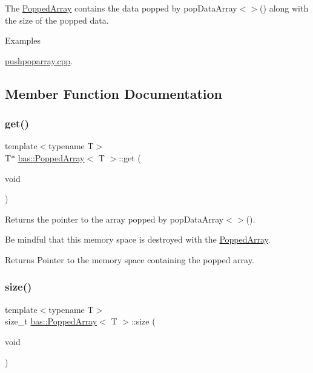 The \mbox{\hyperlink{classbas_1_1PoppedArray}{Popped\+Array}} contains the data popped by pop\+Data\+Array$<$$>$() along with the size of the popped data. \begin{Desc}
\item[Examples]\par
\mbox{\hyperlink{pushpoparray_8cpp-example}{pushpoparray.\+cpp}}.\end{Desc}


\subsection{Member Function Documentation}
\mbox{\label{classbas_1_1PoppedArray_a964ac49c32df363e64c4720479685036}} 
\subsubsection{\texorpdfstring{get()}{get()}}
{\footnotesize\ttfamily template$<$typename T$>$ \\
T$\ast$ \mbox{\hyperlink{classbas_1_1PoppedArray}{bas\+::\+Popped\+Array}}$<$ T $>$\+::get (\begin{DoxyParamCaption}\item[{void}]{ }\end{DoxyParamCaption})\hspace{0.3cm}{\ttfamily [inline]}}



Returns the pointer to the array popped by pop\+Data\+Array$<$$>$(). 

Be mindful that this memory space is destroyed with the \mbox{\hyperlink{classbas_1_1PoppedArray}{Popped\+Array}}.

\begin{DoxyReturn}{Returns}
Pointer to the memory space containing the popped array. 
\end{DoxyReturn}
\mbox{\label{classbas_1_1PoppedArray_aeaaba8025e58cc663ac74426e1cde1b0}} 
\subsubsection{\texorpdfstring{size()}{size()}}
{\footnotesize\ttfamily template$<$typename T$>$ \\
size\+\_\+t \mbox{\hyperlink{classbas_1_1PoppedArray}{bas\+::\+Popped\+Array}}$<$ T $>$\+::size (\begin{DoxyParamCaption}\item[{void}]{ }\end{DoxyParamCaption})\hspace{0.3cm}{\ttfamily [inline]}}



